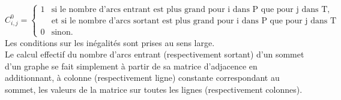 $C^0_{i, j} = \left\{
  \begin{array}{ll}
	  1 & \mbox{si le nombre d'arcs entrant est plus grand pour i dans P que pour j dans T,} \\
	    &  \mbox{et si le nombre d'arcs sortant est plus grand pour i dans P que pour j dans T}
	\\0 & \mbox{sinon.}
  \end{array}
\right.
$
\\
Les conditions sur les inégalités sont prises au sens large.
\\

Le calcul effectif du nombre d'arcs entrant (respectivement sortant) d'un sommet d'un graphe se fait simplement à partir de sa matrice d'adjacence en
additionnant, à colonne (respectivement ligne) constante correspondant au sommet, les valeurs de la matrice sur toutes les lignes (respectivement colonnes).


